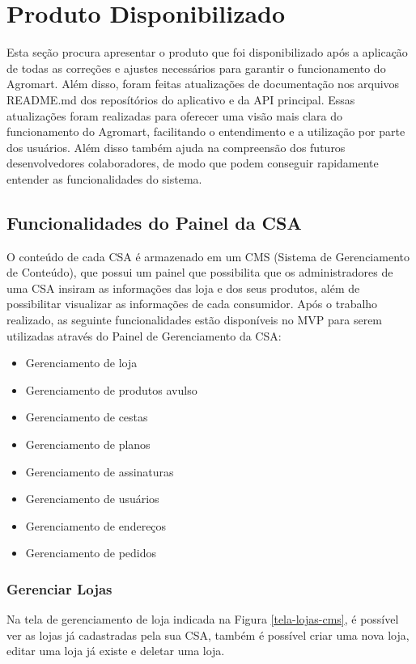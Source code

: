 \chapter[Produto Disponibilizado]{Produto Disponibilizado}
Esta seção procura apresentar o produto que foi disponibilizado após a aplicação de todas as correções e ajustes necessários para garantir o funcionamento do Agromart. Além disso, foram feitas atualizações de documentação nos arquivos README.md dos reposítórios do aplicativo e da API principal. Essas atualizações foram realizadas para oferecer uma visão mais clara do funcionamento do Agromart, facilitando o entendimento e a utilização por parte dos usuários. Além disso também ajuda na compreensão dos futuros desenvolvedores colaboradores, de modo que podem conseguir rapidamente entender as funcionalidades do sistema. 

\section{Funcionalidades do Painel da CSA}
O conteúdo de cada CSA é armazenado em um CMS (Sistema de Gerenciamento de Conteúdo), que possui um painel que possibilita que os administradores de uma CSA insiram as informações das loja e dos seus produtos, além de possibilitar visualizar as informações de cada consumidor. Após o trabalho realizado, as seguinte funcionalidades estão disponíveis no MVP para serem utilizadas através do Painel de Gerenciamento da CSA:

\begin{itemize}
    \item Gerenciamento de loja
    \item Gerenciamento de produtos avulso
    \item Gerenciamento de cestas
    \item Gerenciamento de planos
    \item Gerenciamento de assinaturas
    \item Gerenciamento de usuários
    \item Gerenciamento de endereços
    \item Gerenciamento de pedidos
\end{itemize}

\subsection{Gerenciar Lojas}
Na tela de gerenciamento de loja indicada na Figura \ref{tela-lojas-cms}, é possível ver as lojas já cadastradas pela sua CSA, também é possível criar uma nova loja, editar uma loja já existe e deletar uma loja.

